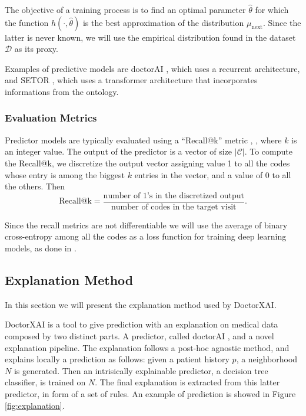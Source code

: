 \documentclass[]{marticle}
\newcommand{\ds}{\mathcal{D}}
\newcommand{\codes}{\mathcal{C}}
\begin{document}
The objective of a training process is to find an optimal parameter $\hat{\theta}$ for which the
function $h(\cdot, \hat{\theta})$ is the best approximation of the distribution $\mu_\text{next}$.
Since the latter is never known, we will use the empirical distribution found in the dataset $\ds$
as its proxy.

Examples of predictive models are doctorAI \cite{paper-doctor-ai}, which uses a recurrent
architecture, and SETOR \cite{setor-paper}, which uses a transformer architecture that incorporates
informations from the ontology.

\subsubsection{Evaluation Metrics}

Predictor models are typically evaluated using a ``Recall@k'' metric \cite{setor-paper},
\cite{panigutti-xai}, where $k$ is an integer value.
The output of the predictor is a vector of size $|\codes|$. To compute the Recall@k, we discretize
the output vector assigning value 1 to all the codes whose entry is among the biggest $k$ entries in
the vector, and a value of 0 to all the others. Then
\begin{equation*}
    \text{Recall@k} = \frac{\text{number of 1's in the discretized output}}
    {\text{number of codes in the target visit}}.
\end{equation*}

Since the recall metrics are not differentiable we will use the average of binary cross-entropy
among all the codes as a loss function for training deep learning models, as done in
\cite{setor-paper}.

\subsection{Explanation Method} \label{sect-drxai}

In this section we will present the explanation method used by DoctorXAI.

DoctorXAI \cite{panigutti-xai} is a tool to give prediction with an explanation on medical data
composed by two distinct parts. A predictor, called doctorAI \cite{paper-doctor-ai}, and a novel
explanation pipeline. The explanation follows a post-hoc agnostic method, and explains locally a
prediction as follows:
given a patient history $p$, a neighborhood $N$ is generated. Then an intrisically explainable
predictor, a decision tree classifier, is trained on $N$. The final explanation is extracted from
this latter predictor, in form of a set of rules. An example of prediction is showed in Figure
\ref{fig:explanation}.
\end{document}
